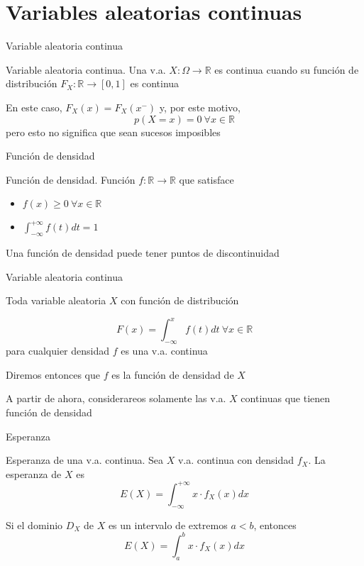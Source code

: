 \documentclass[
  ignorenonframetext,
]{beamer}
\providecommand{\tightlist}{%
  \setlength{\itemsep}{0pt}\setlength{\parskip}{0pt}}
\begin{document}
\hypertarget{variables-aleatorias-continuas}{%
\section{Variables aleatorias
continuas}\label{variables-aleatorias-continuas}}

\begin{frame}{Variable aleatoria continua}
\protect\hypertarget{variable-aleatoria-continua}{}

Variable aleatoria continua. Una v.a.
\(X:\Omega\longrightarrow\mathbb{R}\) es continua cuando su función de
distribución \(F_X:\mathbb{R}\longrightarrow[0,1]\) es continua

En este caso, \(F_X(x)=F_X(x^-)\) y, por este motivo,
\[p(X=x)=0\ \forall x\in\mathbb{R}\] pero esto no significa que sean
sucesos imposibles

\end{frame}

\begin{frame}{Función de densidad}
\protect\hypertarget{funciuxf3n-de-densidad}{}

Función de densidad. Función \(f:\mathbb{R}\longrightarrow\mathbb{R}\)
que satisface

\begin{itemize}
\tightlist
\item
  \(f(x)\ge 0\ \forall x\in\mathbb{R}\)
\item
  \(\int_{-\infty}^{+\infty}f(t)dt=1\)
\end{itemize}

Una función de densidad puede tener puntos de discontinuidad

\end{frame}

\begin{frame}{Variable aleatoria continua}
\protect\hypertarget{variable-aleatoria-continua-1}{}

Toda variable aleatoria \(X\) con función de distribución

\[F(x)=\int_{-\infty}^{x}f(t)dt\ \forall x\in\mathbb{R}\] para cualquier
densidad \(f\) es una v.a. continua

Diremos entonces que \(f\) es la función de densidad de \(X\)

A partir de ahora, considerareos solamente las v.a. \(X\) continuas que
tienen función de densidad

\end{frame}

\begin{frame}{Esperanza}
\protect\hypertarget{esperanza-1}{}

Esperanza de una v.a. continua. Sea \(X\) v.a. continua con densidad
\(f_X\). La esperanza de \(X\) es
\[E(X)=\int_{-\infty}^{+\infty}x\cdot f_X(x)dx\]

Si el dominio \(D_X\) de \(X\) es un intervalo de extremos \(a<b\),
entonces \[E(X)=\int_a^b x\cdot f_X(x)dx\]

\end{frame}
\end{document}
